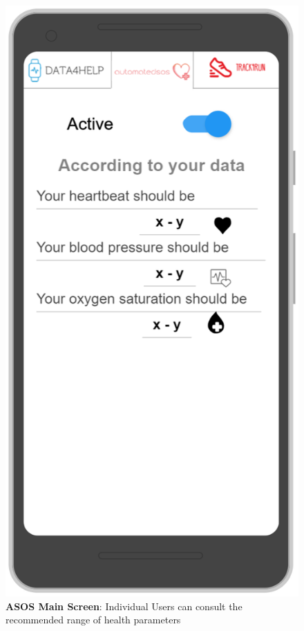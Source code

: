 \begin{figure}[H]
\centering
\includegraphics[scale = 0.5]{Mocks/Mobile_ASOS_Main.PNG}
\caption{\textbf{ASOS Main Screen}: Individual Users can consult the recommended range of health parameters}
\end{figure}

